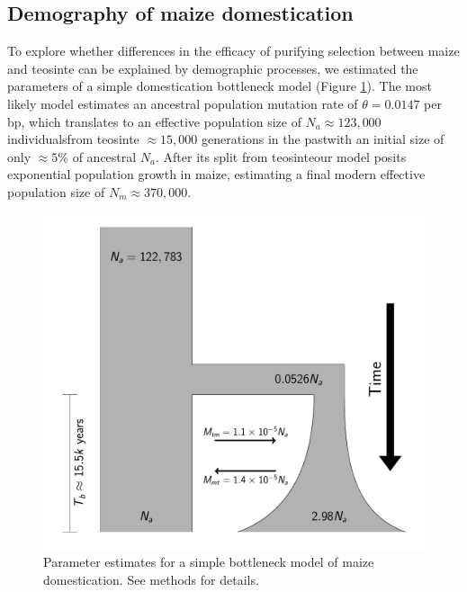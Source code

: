 \documentclass{pnastwo}
\begin{document}
\begin{article}
\subsection{Demography of maize domestication} To explore whether differences in the efficacy of purifying selection between maize and teosinte can be explained by demographic processes, we estimated the parameters of a simple domestication bottleneck model  (Figure \ref{fig:bottleneck}). 
The most likely model estimates an ancestral population mutation rate of $\theta=0.0147$ per bp, which translates to an effective population size of $N_a \approx 123,000$ individuals\DIFdelbegin {}\DIFdelend \DIFaddbegin {}\DIFaddend from teosinte $\approx 15,000$ generations in the past\DIFaddbegin \DIFadd{, }\DIFaddend with an initial size of only $\approx 5\% $ of \DIFaddbegin {}\DIFaddend ancestral $N_a$. 
\DIFdelbegin {}\DIFdelend After its split from teosinte\DIFaddbegin \DIFadd{, }\DIFaddend our model posits exponential population growth in maize, estimating a final modern effective population size of $N_m \approx 370,000$.
\DIFaddbegin {}\DIFaddend 

\DIFdelbegin \DIFdelendFL \DIFaddbeginFL \begin{figure}
\DIFaddendFL \centering
\includegraphics[width=.4\textwidth]{FigsAndFiles/DomesticationModel/domesticationModel.pdf}
\caption{Parameter estimates for a simple bottleneck model of maize domestication. See methods for details. \label{fig:bottleneck} }
\DIFdelbeginFL \DIFdelend \DIFaddbegin \end{figure}
\DIFaddend 


\end{article}
\end{document}
